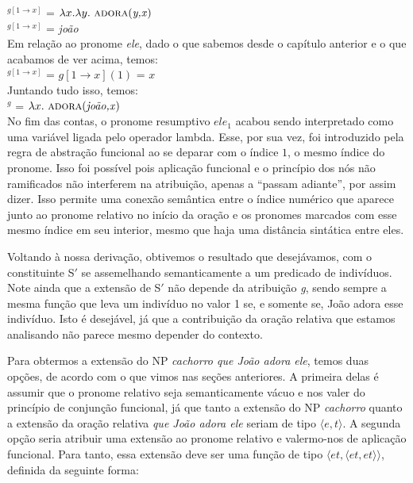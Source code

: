 \n{}$^{g[1 \rightarrow x]}$ = $\lambda x.\lambda y.\ \predica{adora}{y,x}$\\
$^{g[1 \rightarrow x]}$ = \textit{joão}\\

\n Em relação ao pronome \textit{ele}, dado o que sabemos desde o capítulo anterior e o que acabamos de ver acima, temos:\\

\n{}$^{g[1 \rightarrow x]}$ = $g[1 \rightarrow x](1)$ = $x$ \\

\n Juntando tudo isso, temos:\\

\n {}$^{g}$ = $\lambda x.\ \predica{adora}{joão,x}$\\

\n No fim das contas, o pronome resumptivo $ele_{1}$ acabou sendo interpretado como uma variável ligada pelo operador lambda. Esse, por sua vez, foi introduzido pela regra de abstração funcional ao se deparar com o índice $1$, o mesmo índice do pronome. Isso foi possível pois aplicação funcional e o princípio dos nós não ramificados não interferem na atribuição, apenas a ``passam adiante'', por assim dizer. Isso permite uma conexão semântica entre o índice numérico que aparece junto ao pronome relativo no início da oração e os pronomes marcados com esse mesmo índice em seu interior, mesmo que haja uma distância sintática entre eles.

Voltando à nossa derivação, obtivemos o resultado que desejávamos, com o constituinte S$'$ se assemelhando semanticamente a um predicado de indivíduos. Note ainda que a
extensão de S$'$ não depende da atribuição \textit{g}, sendo
sempre a mesma função que leva um indivíduo no valor 1 se, e
somente se, João adora esse indivíduo. Isto é desejável, já que
a contribuição da oração relativa que estamos analisando não
parece mesmo depender do contexto.

Para obtermos a extensão do NP \textit{cachorro que João adora ele},
temos duas opções, de acordo com o que vimos nas seções anteriores. A primeira delas é assumir que o pronome relativo seja
semanticamente vácuo e nos valer do princípio de conjunção
funcional, já que tanto a extensão
do NP \textit{cachorro} quanto a extensão da oração relativa
\textit{que João adora ele} seriam de tipo $\langle e,t\rangle$. A segunda opção seria atribuir uma extensão ao pronome relativo e
valermo-nos de aplicação funcional. Para tanto, essa
extensão deve ser uma função de tipo $\langle et,\langle et,
et\rangle\rangle$, definida da seguinte forma:\\

